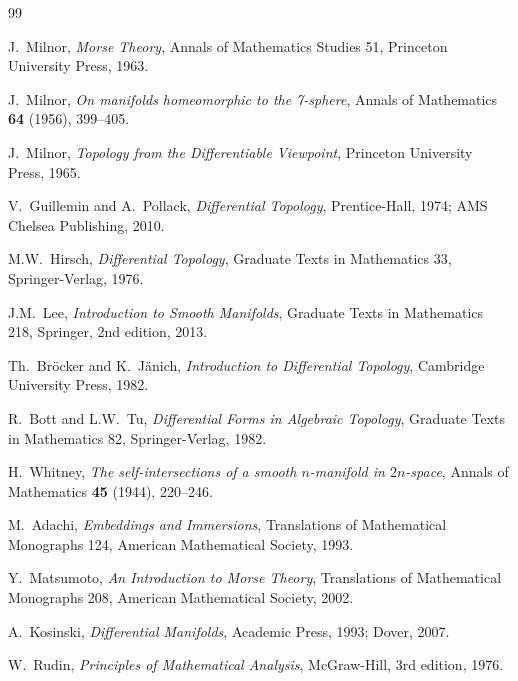 \documentclass[12pt,a4paper,openany]{book}
\theoremstyle{definition}
\theoremstyle{remark}
\begin{document}
\begin{thebibliography}{99}

J.~Milnor,
\textit{Morse Theory},
Annals of Mathematics Studies 51,
Princeton University Press, 1963.

J.~Milnor,
\textit{On manifolds homeomorphic to the 7-sphere},
Annals of Mathematics \textbf{64} (1956), 399--405.

J.~Milnor,
\textit{Topology from the Differentiable Viewpoint},
Princeton University Press, 1965.

V.~Guillemin and A.~Pollack,
\textit{Differential Topology},
Prentice-Hall, 1974; AMS Chelsea Publishing, 2010.

M.W.~Hirsch,
\textit{Differential Topology},
Graduate Texts in Mathematics 33,
Springer-Verlag, 1976.

J.M.~Lee,
\textit{Introduction to Smooth Manifolds},
Graduate Texts in Mathematics 218,
Springer, 2nd edition, 2013.

Th.~Br\"{o}cker and K.~J\"{a}nich,
\textit{Introduction to Differential Topology},
Cambridge University Press, 1982.

R.~Bott and L.W.~Tu,
\textit{Differential Forms in Algebraic Topology},
Graduate Texts in Mathematics 82,
Springer-Verlag, 1982.

H.~Whitney,
\textit{The self-intersections of a smooth $n$-manifold in $2n$-space},
Annals of Mathematics \textbf{45} (1944), 220--246.

M.~Adachi,
\textit{Embeddings and Immersions},
Translations of Mathematical Monographs 124,
American Mathematical Society, 1993.

Y.~Matsumoto,
\textit{An Introduction to Morse Theory},
Translations of Mathematical Monographs 208,
American Mathematical Society, 2002.

A.~Kosinski,
\textit{Differential Manifolds},
Academic Press, 1993; Dover, 2007.

W.~Rudin,
\textit{Principles of Mathematical Analysis},
McGraw-Hill, 3rd edition, 1976.


\end{thebibliography}
\end{document}
